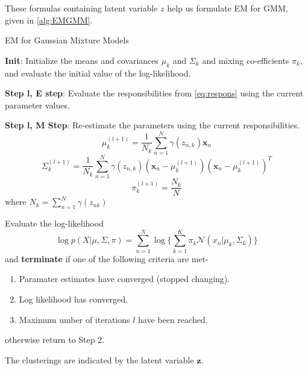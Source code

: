 These formulas containing latent variable $z$ help us formulate EM for GMM, given in \ref{alg:EMGMM}.

\begin{algorithm} [h]
\caption{EM for Gaussian Mixture Models}
\label{alg:EMGMM}
        \item \textbf{Init}: Initialize the means and covariances $\mu_k$ and $\Sigma_k$ and mixing co-efficients $\pi_k$, and evaluate the initial value of the log-likelihood.
        \item \textbf{Step l, E step}: Evaluate the responsibilities from \eqref{eq:respons} using the current parameter values.
        \item \textbf{Step l, M Step}: Re-estimate the parameters using the current responsibilities.
        \begin{equation*}
             \mu_k^{(l+1)} = \frac{1}{N_k} \sum_{n=1}^{N} \gamma(z_{n,k}) \mathbf{x}_n 
             \end{equation*}
             \begin{equation*}
                             \Sigma_k^{(l+1)} = \frac{1}{N_k} \sum_{n=1}^{N} \gamma(z_{n,k}) (\mathbf{x}_n - \mu_k^{(l+1)})(\mathbf{x}_n - \mu_k^{(l+1)})^T
        \end{equation*}
        \begin{equation*}
            \pi_k^{(l+1)} = \frac{N_k}{N}
        \end{equation*}
        where $N_k = \sum_{n=1}^N \gamma(z_{nk})$
        \item Evaluate the log-likelihood
        \begin{equation*}
            \log p(X|\mu,\Sigma, \pi) = \sum_{n=1}^N \log \{ \sum_{k=1}^K \pi_k \mathcal{N} (x_n|\mu_k,\Sigma_k) \}
        \end{equation*}
        and \textbf{terminate} if one of the following criteria are met- 
        \begin{enumerate}
            \item Paramater estimates have converged (stopped changing).
            \item Log likelihood has converged.
            \item Maximum umber of iterations $l$ have been reached.
        \end{enumerate}
        otherwise return to Step 2.
\end{algorithm}

The clusterings are indicated by the latent variable $\mathbf{z}$.

